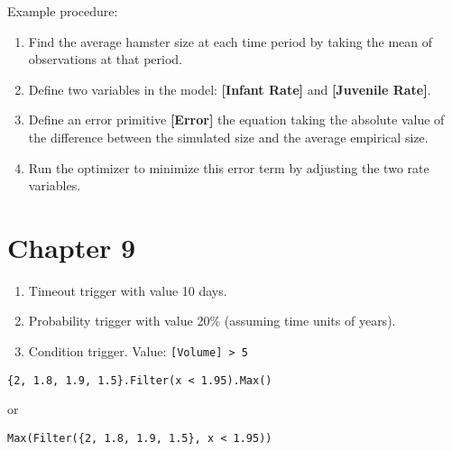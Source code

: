\documentclass[]{memoir}
\newcommand{\p}[1]{\textbf{{[}#1{]}}}
\begin{document}
Example procedure:

\begin{enumerate}
\def\labelenumi{\arabic{enumi}.}
\itemsep1pt\parskip0pt
\item
  Find the average hamster size at each time period by taking the mean
  of observations at that period.
\item
  Define two variables in the model: \p{Infant Rate} and
  \p{Juvenile Rate}.
\item
  Define an error primitive \p{Error} the equation taking the absolute
  value of the difference between the simulated size and the average
  empirical size.
\item
  Run the optimizer to minimize this error term by adjusting the two
  rate variables.
\end{enumerate}

\section{Chapter 9}


\begin{enumerate}
\def\labelenumi{\arabic{enumi}.}
\itemsep1pt\parskip0pt
\item
  Timeout trigger with value 10 days.
\item
  Probability trigger with value 20\% (assuming time units of years).
\item
  Condition trigger. Value: \lstinline![Volume] > 5!
\end{enumerate}


\lstinline!{2, 1.8, 1.9, 1.5}.Filter(x < 1.95).Max()!

or

\lstinline!Max(Filter({2, 1.8, 1.9, 1.5}, x < 1.95))!

\end{document}
